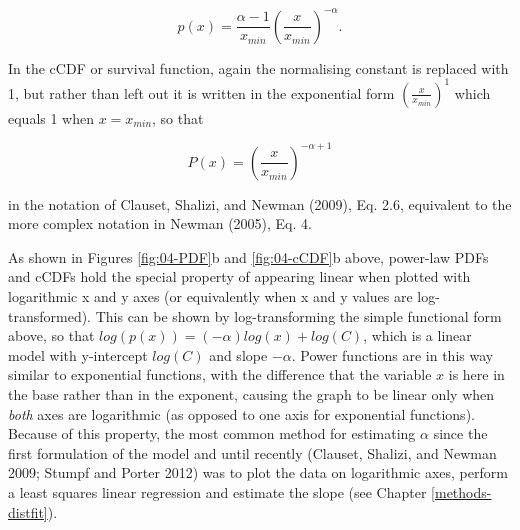 \documentclass[
  12pt,
  a4paper, twoside]{book}
\begin{document}
\begin{equation}
p(x) = \frac{\alpha-1}{x_{min}}(\frac{x}{x_{min}})^{-\alpha}.
\label{eq:power-law}
\end{equation}

In the cCDF or survival function, again the normalising constant is replaced with 1, but rather than left out it is written in the exponential form \((\frac{x}{x_{min}})^1\) which equals 1 when \(x = x_{min}\), so that

\begin{equation}
P(x) = (\frac{x}{x_{min}})^{-\alpha+1}
\label{eq:pareto}
\end{equation}

in the notation of Clauset, Shalizi, and Newman (2009), Eq. 2.6, equivalent to the more complex notation in Newman (2005), Eq. 4.

As shown in Figures \ref{fig:04-PDF}b and \ref{fig:04-cCDF}b above, power-law PDFs and cCDFs hold the special property of appearing linear when plotted with logarithmic x and y axes (or equivalently when x and y values are log-transformed). This can be shown by log-transforming the simple functional form above, so that \(log(p(x))=(-\alpha)log(x)+log(C)\), which is a linear model with y-intercept \(log(C)\) and slope \(-\alpha\). Power functions are in this way similar to exponential functions, with the difference that the variable \(x\) is here in the base rather than in the exponent, causing the graph to be linear only when \emph{both} axes are logarithmic (as opposed to one axis for exponential functions). Because of this property, the most common method for estimating \(\alpha\) since the first formulation of the model and until recently (Clauset, Shalizi, and Newman 2009; Stumpf and Porter 2012) was to plot the data on logarithmic axes, perform a least squares linear regression and estimate the slope (see Chapter \ref{methods-distfit}).
\end{document}
